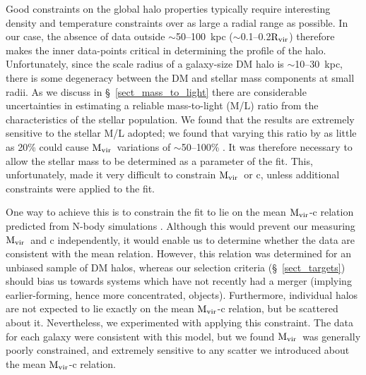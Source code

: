 \documentclass{emulateapj}
\def \eg {e.g.}
\newcommand{\mvir}{${\rm M_{vir}}$}
\newcommand{\rvir }{${\rm R_{vir}}$}
\begin{document}
Good constraints on the global halo properties typically require interesting 
density and temperature constraints over as large a radial range as possible.
In our case, the absence of data outside $\sim$50--100~kpc ($\sim$0.1--0.2\rvir) 
therefore
makes the inner data-points critical in determining the profile of the 
halo. Unfortunately, since the scale radius of a galaxy-size DM halo is 
$\sim$10--30~kpc, there is some degeneracy between the DM and 
stellar mass components at small radii.
As we discuss in \S~\ref{sect_mass_to_light} there are considerable
uncertainties in estimating a reliable mass-to-light (M/L) ratio from
the characteristics of the stellar population. We found that the 
results are extremely sensitive to the stellar M/L adopted; we found
that varying this ratio by as little as 20\% could cause \mvir\
variations of $\sim$50--100\% \citep[see][]{humphrey05b}.
It was therefore necessary to allow the stellar mass to be determined as a 
parameter of the fit. This, unfortunately, made it very difficult
to constrain \mvir\ or c, unless additional constraints were applied
to the fit.

One way to achieve this is to constrain the fit to lie on the mean
\mvir-c relation predicted from N-body simulations \citep[\eg][]{bullock01a}.
Although this would prevent our measuring \mvir\ and c independently,
it would enable us to determine whether the 
data are consistent with the mean relation.
However, this relation was determined for an unbiased sample of 
DM halos, whereas our selection criteria (\S~\ref{sect_targets}) should 
bias us towards systems which have not recently had a merger (implying
earlier-forming, hence more concentrated, objects). 
Furthermore, individual halos are not expected
to lie exactly on the mean \mvir-c relation, but be scattered
about it. Nevertheless, we experimented with applying this constraint.
The data for each galaxy were consistent with this model, but
we found \mvir\ was generally poorly constrained, and extremely sensitive
to any scatter we introduced about the mean \mvir-c relation.
\end{document}
